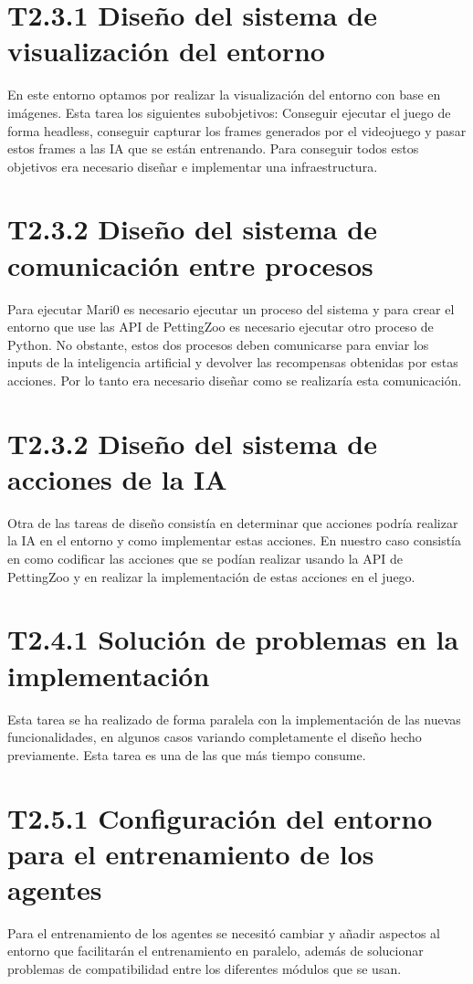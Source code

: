 \section*{T2.3.1 Diseño del sistema de visualización del entorno}
En este entorno optamos por realizar la visualización del entorno con base en imágenes. Esta tarea los siguientes subobjetivos: Conseguir ejecutar el juego de forma headless, conseguir capturar los frames generados por el videojuego y pasar estos frames a las IA que se están entrenando. Para conseguir todos estos objetivos era necesario diseñar e implementar una infraestructura.

\section*{T2.3.2 Diseño del sistema de comunicación entre procesos}
Para ejecutar Mari0 es necesario ejecutar un proceso del sistema y para crear el entorno que use las API de PettingZoo es necesario ejecutar otro proceso de Python. No obstante, estos dos procesos deben comunicarse para enviar los inputs de la inteligencia artificial y devolver las recompensas obtenidas por estas acciones. Por lo tanto era necesario diseñar como se realizaría esta comunicación.

\section*{T2.3.2 Diseño del sistema de acciones de la IA}
Otra de las tareas de diseño consistía en determinar que acciones podría realizar la IA en el entorno y como implementar estas acciones. En nuestro caso consistía en como codificar las acciones que se podían realizar usando la API de PettingZoo y en realizar la implementación de estas acciones en el juego.

\section*{T2.4.1 Solución de problemas en la implementación}
Esta tarea se ha realizado de forma paralela con la implementación de las nuevas funcionalidades, en algunos casos variando completamente el diseño hecho previamente. Esta tarea es una de las que más tiempo consume.

\section*{T2.5.1 Configuración del entorno para el entrenamiento de los agentes}
Para el entrenamiento de los agentes se necesitó cambiar y añadir aspectos al entorno que facilitarán el entrenamiento en paralelo, además de solucionar problemas de compatibilidad entre los diferentes módulos que se usan.

